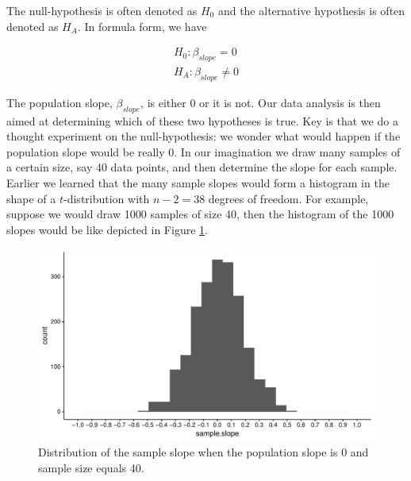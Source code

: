 \documentclass[]{book}\usepackage[]{graphicx}\usepackage[]{color}
\makeatletter
\def\maxwidth{ %
  \ifdim\Gin@nat@width>\linewidth
    \linewidth
  \else
    \Gin@nat@width
  \fi
}
\newenvironment{knitrout}{}{} %
\makeatother
\begin{document}
The null-hypothesis is often denoted as $H_0$ and the alternative hypothesis is often denoted as $H_A$. In formula form, we have


\begin{eqnarray}
H_0: \beta_{slope}=0 \\
H_A: \beta_{slope} \neq 0
\end{eqnarray}

The population slope, $\beta_{slope}$, is either 0 or it is not. Our data analysis is then aimed at determining which of these two hypotheses is true. Key is that we do a thought experiment on the null-hypothesis: we wonder what would happen if the population slope would be really 0. In our imagination we draw many samples of a certain size, say 40 data points, and then determine the slope for each sample. Earlier we learned that the many sample slopes would form a histogram in the shape of a $t$-distribution with $n-2=38$ degrees of freedom. For example, suppose we would draw 1000 samples of size 40, then the histogram of the 1000 slopes would be like depicted in Figure \ref{fig:inf_14}.

\begin{knitrout}
\color{fgcolor}\begin{figure}

{\centering \includegraphics[width=\maxwidth]{figure/inf_14-1} 

}

\caption[Distribution of the sample slope when the population slope is 0 and sample size equals 40]{Distribution of the sample slope when the population slope is 0 and sample size equals 40.}\label{fig:inf_14}
\end{figure}


\end{knitrout}
\end{document}
